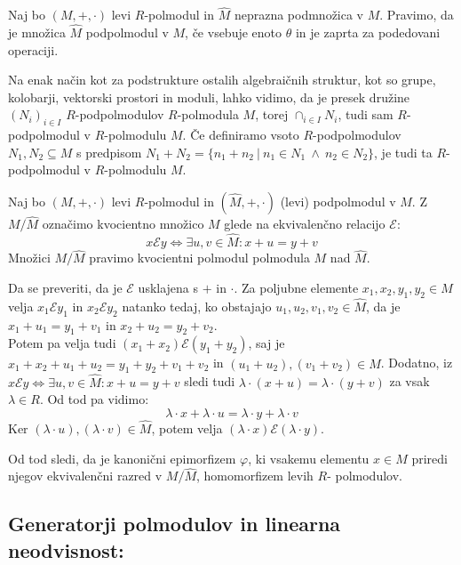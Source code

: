\documentclass[mat1]{fmfdelo}
\begin{document}
\begin{definicija}
	Naj bo $(M, +, \cdot)$ levi $R$-polmodul in $\widehat{M}$ neprazna podmnožica v $M$. Pravimo, da je množica $\widehat{M}$ podpolmodul v $M$, če vsebuje enoto $\theta$ in je zaprta za podedovani operaciji.
\end{definicija}

Na enak način kot za podstrukture ostalih algebraičnih struktur, kot so grupe, kolobarji, vektorski prostori in moduli, lahko vidimo, da je presek družine $(N_i)_{i\in I}$ $R$-podpolmodulov $R$-polmodula $M$, torej $\cap_{i\in I}N_i$, tudi sam $R$-podpolmodul v $R$-polmodulu $M$. Če definiramo vsoto $R$-podpolmodulov $N_1,N_2\subseteq M$ s predpisom $N_1 + N_2 =\{n_1 + n_2~|~n_1\in N_1~\land~n_2\in N_2\}$, je tudi ta $R$-podpolmodul v $R$-polmodulu $M$.

\begin{definicija}
	Naj bo $(M, +, \cdot)$ levi $R$-polmodul in $(\widehat{M}, +, \cdot)$ (levi) podpolmodul v $M$. Z $M/ \widehat{M}$ označimo kvocientno množico $M$ glede na ekvivalenčno relacijo $\mathcal{E}$: $$x\mathcal{E}y \iff \exists u, v\in\widehat{M}: x + u = y + v$$ Množici $M/\widehat{M}$ pravimo kvocientni polmodul polmodula $M$ nad $\widehat{M}$.
\end{definicija}

Da se preveriti, da je $\mathcal{E}$ usklajena s $+$ in $\cdot$. Za poljubne elemente $x_1, x_2, y_1, y_2 \in M$ velja $x_1\mathcal{E}y_1$ in $x_2\mathcal{E}y_2$ natanko tedaj, ko obstajajo $u_1, u_2, v_1, v_2 \in \widehat{M}$, da je $x_1 + u_1 = y_1 + v_1$ in $ x_2 + u_2 = y_2 + v_2$. \\

Potem pa velja tudi $(x_1 + x_2)\mathcal{E}(y_1 + y_2)$, saj je $x_1 + x_2 + u_1 + u_2 = y_1 + y_2 + v_1 + v_2$ in $(u_1 + u_2), (v_1 + v_2)\in \widehat{M}$. Dodatno, iz $x\mathcal{E}y \iff \exists u, v\in\widehat{M}: x + u = y + v$ sledi tudi $\lambda\cdot (x + u) = \lambda\cdot (y + v)$ za vsak $\lambda\in R$. Od tod pa vidimo: $$\lambda\cdot x + \lambda\cdot u = \lambda\cdot y + \lambda\cdot v$$ Ker $(\lambda\cdot u), (\lambda\cdot v)\in \widehat{M}$, potem velja $(\lambda\cdot x) \mathcal{E} (\lambda\cdot y)$.

Od tod sledi, da je kanonični epimorfizem $\varphi$, ki vsakemu elementu $x\in M$ priredi njegov ekvivalenčni razred v $M/\widehat{M}$, homomorfizem levih $R$- polmodulov.

\subsection{Generatorji polmodulov in linearna neodvisnost:}
\end{document}
